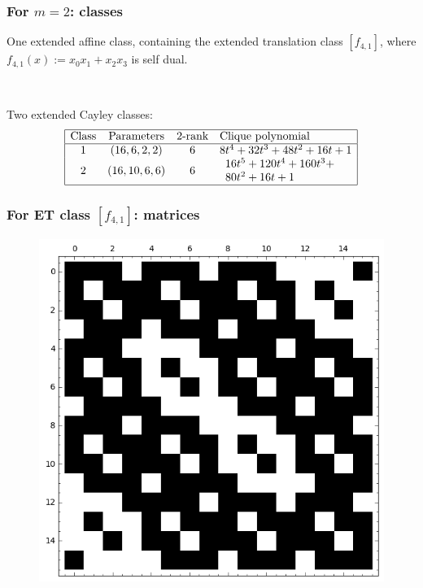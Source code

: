 \documentclass[pdf,sprung,slideColor,nocolorBG]{beamer}
\newenvironment{colortheme}[1]{
\def\ProvidesPackageRCS $##1${\relax}
\renewcommand{\ProcessOptions}{\relax}
\makeatletter

\makeatother
}{}
\begin{document}
\begin{colortheme}{jubata}
\begin{frame}
\begin{figure}
\begin{minipage}{.48\textwidth}
  \label{fig:c2_1_bent_cayley_graph_index_matrix}
\end{minipage}
\end{figure}
\end{frame}
\begin{frame}
\frametitle{For $m=2$: classes}

One extended affine class, containing the extended translation class $[f_{4,1}]$, where 
$f_{4,1}(x) := x_0 x_1 + x_2 x_3$ is self dual.

~

Two extended Cayley classes:
\begin{align*}
\begin{array}{|cccl|}
\hline
\text{Class} &
\text{Parameters} & 
\text{2-rank} &
\text{Clique polynomial}
\\
\hline
1 &
(16, 6, 2, 2) & 
6 &
8t^{4} + 32t^{3} + 48t^{2} + 16t + 1
\\
2 &
(16, 10, 6, 6) & 
6 &
\begin{array}{l}
16t^{5} + 120t^{4} + 160t^{3} + 
\\
80t^{2} + 16t + 1
\end{array}
\\
\hline
\end{array}
\end{align*}
\end{frame}
\begin{frame}
\frametitle{For ET class $[f_{4,1}]$: matrices}
\begin{figure}
\centering
\begin{minipage}{.48\textwidth}
  \centering
  \includegraphics[width=.9\linewidth]{../matrix_plot/re4_1_weight_class_matrix.png}

\end{minipage}
\end{figure}
\end{frame}
\end{colortheme}
\end{document}
